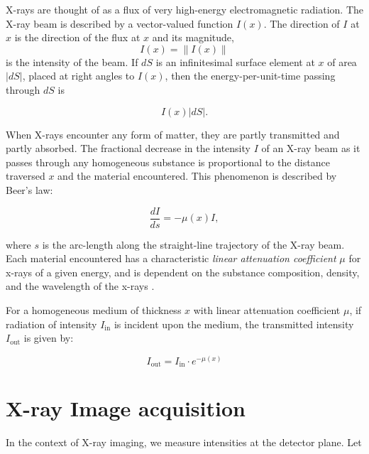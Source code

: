 \documentclass[nomenclature, english, bibtex]{kththesis}
\numberwithin{listing}{chapter}
\begin{document}
X-rays are thought of as a flux of very high-energy electromagnetic radiation. The X-ray beam is
described by a vector-valued function $I(x)$. The direction of $I$ at $x$ is the direction of the flux at $x$ and
its magnitude,
\begin{equation}
    I (x) = \lVert I(x) \rVert
\end{equation}
is the intensity of the beam. If $dS$ is an infinitesimal surface element at $x$ of area
$|dS|$, placed at right angles to $I(x)$, then the energy-per-unit-time passing through $dS$ is \cite[p.~56]{epstein2008}

\begin{equation}
    I (x) |dS|.
\end{equation}

When X-rays encounter any form of matter, they are partly transmitted and partly absorbed.
The fractional decrease in the intensity $I$ of an X-ray beam as it passes
through any homogeneous substance is proportional to the distance traversed $x$
and the material encountered\cite[p.~11]{cullityElementsXrayDiffraction2014}.
This phenomenon is described by Beer's law:

\begin{equation}
    \frac{dI}{ds} = -\mu(x)I,
    \label{eq:BeerLambert}
\end{equation}

where $s$ is the arc-length along the straight-line trajectory of the X-ray beam.
Each material encountered has a characteristic \textit{linear attenuation coefficient} $\mu$ for x-rays of a
given energy, and is dependent on the substance composition, density, and the wavelength of the x-rays \cite[p.~57]{epstein2008}.

For a homogeneous medium of thickness $x$ with linear attenuation coefficient $\mu$, if radiation of intensity
$I_{\text{in}}$ is incident upon the medium, the transmitted intensity $I_{\text{out}}$ is given by:

\begin{equation}
I_{\text{out}} = I_{\text{in}} \cdot e^{-\mu(x)}
\label{eq:beer_lambert}
\end{equation}

\section{X-ray Image acquisition}

In the context of X-ray imaging, we measure intensities at the detector plane. Let
\end{document}

